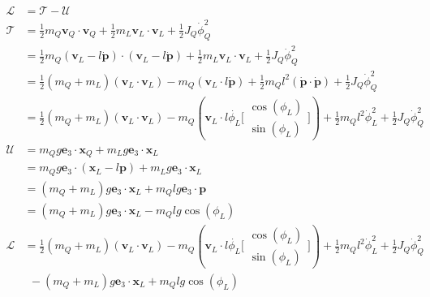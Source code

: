 \documentclass[11pt]{article}
\begin{document}
\mbox{} \newline
\begin{align*}
\mathcal{L} &= \mathcal{T} - \mathcal{U} \\
\mathcal{T} &= \frac{1}{2}m_Q \mathbf{v}_Q \cdot \mathbf{v}_Q + \frac{1}{2} m_L \mathbf{v}_L \cdot \mathbf{v}_L + \frac{1}{2} J_Q \dot{\phi}_Q^2 \\
&= \frac{1}{2} m_Q (\mathbf{v}_L - l \dot{\mathbf{p}}) \cdot (\mathbf{v}_L - l \dot{\mathbf{p}}) + \frac{1}{2} m_L \mathbf{v}_L \cdot \mathbf{v}_L + \frac{1}{2} J_Q \dot{\phi}_Q^2 \\
&= \frac{1}{2} (m_Q+m_L) (\mathbf{v}_L \cdot \mathbf{v}_L) - m_Q (\mathbf{v}_L \cdot l \dot{\mathbf{p}}) + \frac{1}{2} m_Q l^2 (\dot{\mathbf{p}} \cdot \dot{\mathbf{p}}) + \frac{1}{2} J_Q \dot{\phi}_Q^2 \\
&= \frac{1}{2} (m_Q+m_L) (\mathbf{v}_L \cdot \mathbf{v}_L) - m_Q (\mathbf{v}_L \cdot l \dot{\phi_L} 
\bigl [ \begin{smallmatrix}
\cos(\phi_L) \\ \sin(\phi_L)
\end{smallmatrix} \bigr ] 
) + \frac{1}{2} m_Q l^2 \dot{\phi}_L^2 + \frac{1}{2} J_Q \dot{\phi}_Q^2 \\
\mathcal{U} &= m_Q g \mathbf{e}_3 \cdot \mathbf{x}_Q + m_L g \mathbf{e}_3 \cdot \mathbf{x}_L \\
 &= m_Q g \mathbf{e}_3 \cdot (\mathbf{x}_L - l \mathbf{p}) + m_L g \mathbf{e}_3 \cdot \mathbf{x}_L \\
&= (m_Q + m_L) g \mathbf{e}_3 \cdot \mathbf{x}_L + m_Q l g \mathbf{e}_3 \cdot \mathbf{p} \\
&= (m_Q + m_L) g \mathbf{e}_3 \cdot \mathbf{x}_L - m_Q l g \cos(\phi_L) \\
\mathcal{L} &= \frac{1}{2} (m_Q+m_L) (\mathbf{v}_L \cdot \mathbf{v}_L) - m_Q (\mathbf{v}_L \cdot l \dot{\phi_L} 
\bigl [ \begin{smallmatrix}
\cos(\phi_L) \\ \sin(\phi_L)
\end{smallmatrix} \bigr ] 
) + \frac{1}{2} m_Q l^2 \dot{\phi}_L^2 + \frac{1}{2} J_Q \dot{\phi}_Q^2 \\  
& \ \ - (m_Q + m_L) g \mathbf{e}_3 \cdot \mathbf{x}_L + m_Q l g \cos(\phi_L)
\end{align*}
\end{document}
